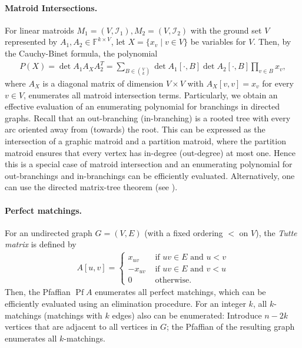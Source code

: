 \documentclass{theoretics}
\newcommand{\F}{\ensuremath{\mathbb F}\xspace}
\newcommand{\cI}{\ensuremath{\mathcal I}\xspace}
\DeclareMathOperator{\Pf}{Pf}
\begin{document}
\paragraph*{Matroid Intersections.}
For linear matroids $M_1 = (V, \cI_1), M_2 = (V, \cI_2)$ with the ground set $V$ represented by $A_1, A_2 \in \F^{k \times V}$, let $X = \{ x_v \mid v \in V \}$ be variables for $V$.
Then, by the Cauchy-Binet formula, the polynomial
\begin{align*}
  P(X) = \det A_1 A_X A_2^T = \sum_{B \in \binom{V}{k}} \det A_1[\cdot, B] \det A_2[\cdot, B] \prod_{v \in B} x_v,
\end{align*}
where $A_X$ is a diagonal matrix of dimension $V \times V$ with $A_X[v, v] = x_v$ for every $v \in V$, enumerates all matroid intersection terms.
Particularly, we obtain an effective evaluation of an enumerating polynomial for branchings in directed graphs.
Recall that an out-branching (in-branching) is a rooted tree with every arc oriented away from (towards) the root.
This can be expressed as the intersection of a graphic matroid and a partition matroid, where the partition matroid ensures that every vertex has in-degree (out-degree) at most one.
Hence this is a special case of matroid intersection and an enumerating polynomial for out-branchings and in-branchings can be efficiently evaluated.
Alternatively, one can use the directed matrix-tree theorem (see \cite{BjorklundKK17directed,gessel95algebraic}).

\paragraph*{Perfect matchings.}
For an undirected graph $G = (V, E)$ (with a fixed ordering $<$ on $V$), the \emph{Tutte matrix} is defined by
\begin{align*}
  A[u,v] = \begin{cases}
    x_{uv} & \text{ if } uv \in E \text{ and } u < v \\
    -x_{uv} & \text{ if } uv \in E \text{ and } v < u \\
    0 & \text{ otherwise}.
  \end{cases}
\end{align*}
Then, the Pfaffian $\Pf A$ enumerates all perfect matchings, which can be efficiently evaluated using an elimination procedure.
For an integer $k$, all $k$-matchings (matchings with $k$ edges) also can be enumerated: Introduce $n - 2k$ vertices that are adjacent to all vertices in $G$; the Pfaffian of the resulting graph enumerates all $k$-matchings.
\end{document}
